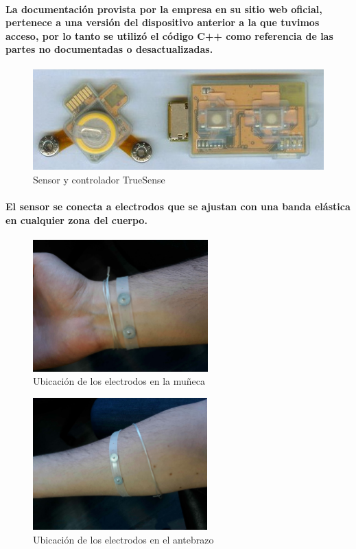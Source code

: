 \documentclass{article}
\begin{document}
\paragraph{
La documentación provista por la empresa en su sitio web oficial, pertenece a una versión del dispositivo anterior a la que tuvimos acceso, por lo tanto se utilizó el código C++ como referencia de las partes no documentadas o desactualizadas.
}
\begin{figure}[ht]
    \centering
    \includegraphics[scale=1]{truesense}
    \caption{Sensor y controlador TrueSense}
    \label{fig:truesense}
\end{figure}

\paragraph{
El sensor se conecta a electrodos que se ajustan con una banda elástica en cualquier zona del cuerpo.
}

\begin{figure}[ht]
    \centering
    \includegraphics[height=2in]{electrodo_munieca.png}%
    \caption{Ubicación de los electrodos en la muñeca}
    \label{fig:electrodos1}
\end{figure}

\begin{figure}[ht]
    \centering
    \includegraphics[height=2in]{electrodo_antebrazo.png}%
    \caption{Ubicación de los electrodos en el antebrazo}
    \label{fig:electrodos2}
\end{figure}
\end{document}

